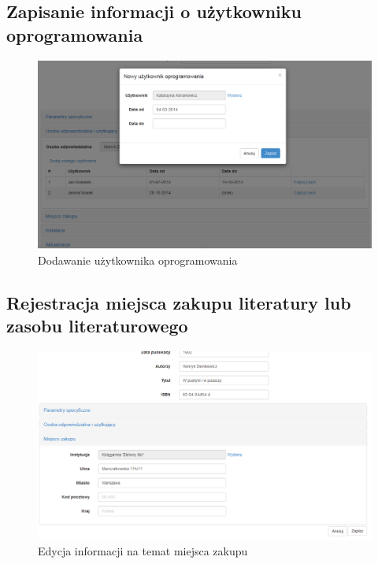 \subsection{Zapisanie informacji o użytkowniku oprogramowania}
\begin{figure}[H]
	\centering
	\includegraphics[scale=0.4]{img/screens/nowyUzytkownikOprogramowania.png}
	\caption{Dodawanie użytkownika oprogramowania}
\end{figure}

\subsection{Rejestracja miejsca zakupu literatury lub zasobu literaturowego}
\begin{figure}[H]
	\centering
	\includegraphics[scale=0.4]{img/screens/miejsceZakupuLiteratura.png}
	\caption{Edycja informacji na temat miejsca zakupu}
\end{figure}

